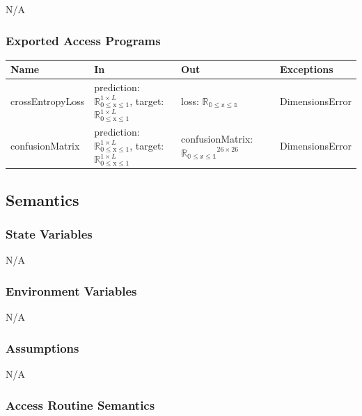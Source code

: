 \documentclass[12pt, titlepage]{article}
\begin{document}
N/A

\subsubsection{Exported Access Programs}

\begin{center}
\begin{tabular}{p{4cm} p{4cm} p{4cm} p{2cm}}
\hline
\textbf{Name} & \textbf{In} & \textbf{Out} & \textbf{Exceptions} \\
\hline
crossEntropyLoss & prediction: $\mathbb{R}_{\text{0} \leq \text{x} \leq \text{1}}^{1 \times L}$, target: $\mathbb{R}_{\text{0} \leq \text{x} \leq \text{1}}^{1 \times L}$ & loss: $\mathbb{R_{\text{0} \leq \text{x} \leq \text{1}}}$ & DimensionsError \\
confusionMatrix & prediction: $\mathbb{R}_{\text{0} \leq \text{x} \leq \text{1}}^{1 \times L}$, target: $\mathbb{R}_{\text{0} \leq \text{x} \leq \text{1}}^{1 \times L}$ & confusionMatrix: $\mathbb{R_{\text{0} \leq \text{x} \leq \text{1}}}^{26 \times 26}$ & DimensionsError \\
\hline
\end{tabular}
\end{center}

\subsection{Semantics}

\subsubsection{State Variables}

N/A

\subsubsection{Environment Variables}

N/A

\subsubsection{Assumptions}

N/A

\subsubsection{Access Routine Semantics}
\end{document}
